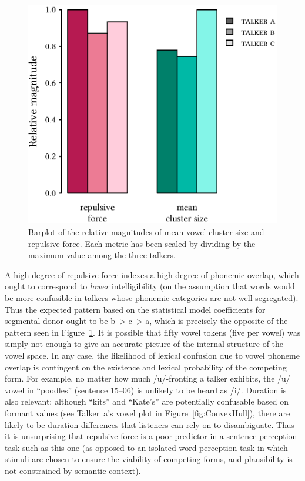 \begin{figure}[bt]
	\begin{centering}
	\includegraphics{figures/posthocs/ForceCluster.eps}
	\caption[Barplot of vowel overlap and encroachment metrics]{Barplot of the relative magnitudes of mean vowel cluster size and repulsive force.  Each metric has been scaled by dividing by the maximum value among the three talkers.\label{fig:ForceCluster}}
	\end{centering}
\end{figure}

A high degree of repulsive force indexes a high degree of phonemic overlap, which ought to correspond to \emph{lower} intelligibility (on the assumption that words would be more confusible in talkers whose phonemic categories are not well segregated).  Thus the expected pattern based on the statistical model coefficients for segmental donor ought to be \ac{b}~> \ac{c}~> \ac{a}, which is precisely the opposite of the pattern seen in Figure~\ref{fig:ForceCluster}.  It is possible that fifty vowel tokens (five per vowel) was simply not enough to give an accurate picture of the internal structure of the vowel space.  In any case, the likelihood of lexical confusion due to vowel phoneme overlap is contingent on the existence and lexical probability of the competing form.  For example, no matter how much /u/-fronting a talker exhibits, the /u/ vowel in “poodles” (sentence 15–06) is unlikely to be heard as /i/.  Duration is also relevant: although “kits” and “Kate’s” are potentially confusable based on formant values (see Talker~\ac{a}’s vowel plot in Figure~\ref{fig:ConvexHull}), there are likely to be duration differences that listeners can rely on to disambiguate.  Thus it is unsurprising that repulsive force is a poor predictor in a sentence perception task such as this one (as opposed to an isolated word perception task in which stimuli are chosen to ensure the viability of competing forms, and plausibility is not constrained by semantic context).

